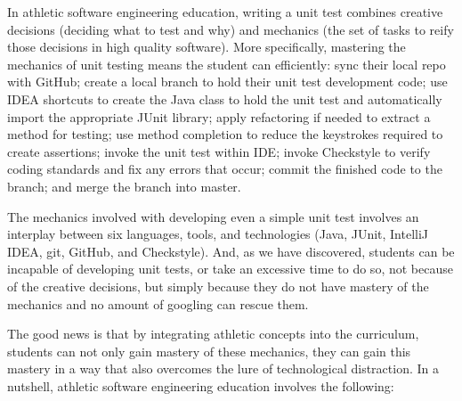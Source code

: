 In athletic software engineering education, writing a unit test combines creative decisions (deciding what to test and why) and mechanics (the set of tasks to reify those decisions in high quality software).  %
%
More specifically, mastering the mechanics of unit testing means the student can efficiently: sync their local repo with GitHub; create a local branch to hold their unit test development code; use IDEA shortcuts to create the Java class to hold the unit test and automatically import the appropriate JUnit library; apply refactoring if needed to extract a method for testing; use method completion to reduce the keystrokes required to create assertions; invoke the unit test within IDE; invoke Checkstyle to verify coding standards and fix any errors that occur; commit the finished code to the branch; and merge the branch into master. 

The mechanics involved with developing even a simple unit test involves an interplay between six languages, tools, and technologies (Java, JUnit, IntelliJ IDEA, git, GitHub, and Checkstyle). And, as we have discovered, students can be incapable of developing unit tests, or take an excessive time to do so, not because of the creative decisions, but simply because they do not have mastery of the mechanics and no amount of googling can rescue them.

The good news is that by integrating athletic concepts into the curriculum, students can not only gain mastery of these mechanics, they can gain this mastery in a way that also overcomes the lure of technological distraction.  In a nutshell, athletic software engineering education involves the following:

